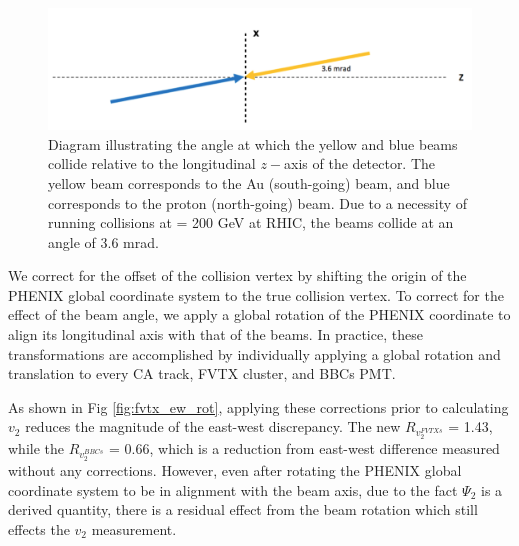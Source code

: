 \begin{figure}[!ht]
\begin{center}
\includegraphics[width=0.75\linewidth]{figs/beam_angle.png}
\caption{Diagram illustrating the angle at which the yellow and blue beams collide relative to the longitudinal $z-$axis of the detector. The yellow beam corresponds to the Au (south-going) beam, and blue corresponds to the proton (north-going) beam. Due to a necessity of running \pau collisions at \sqsn = 200 GeV at RHIC, the beams collide at an angle of 3.6 mrad.}
\label{fig:diagram2}
\end{center}
\end{figure}

We correct for the offset of the collision vertex by shifting the origin of the PHENIX global coordinate system to the true collision vertex. To correct for the effect of the beam angle, we apply a global rotation of the PHENIX coordinate to align its longitudinal axis with that of the beams. In practice, these transformations are accomplished by individually applying a global rotation and translation to every CA track, FVTX cluster, and BBCs PMT. 

As shown in Fig \ref{fig:fvtx_ew_rot}, applying these corrections prior to calculating $v_2$ reduces the magnitude of the east-west discrepancy. The new $R_{v_2^{FVTXs}}$ = 1.43, while the $R_{v_2^{BBCs}}$ = 0.66, which is a reduction from east-west difference measured without any corrections. However, even after rotating the PHENIX global coordinate system to be in alignment with the beam axis, due to the fact $\Psi_2$ is a derived quantity, there is a residual effect from the beam rotation which still effects the $v_2$ measurement. 

